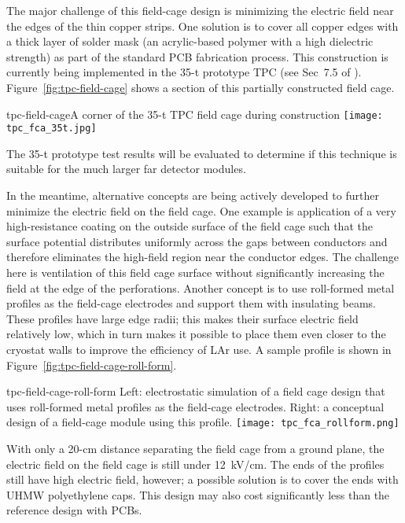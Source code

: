{The major challenge of this field-cage design is minimizing the
electric field near the edges of the thin copper strips.  One solution
is to cover all copper edges with a thick layer of solder mask (an
acrylic-based polymer with a high dielectric strength) as part of the
standard PCB fabrication process.  This construction is currently
being implemented in the 35-t prototype TPC (see Sec~7.5 of
\anxlbnefd).  Figure~\ref{fig:tpc-field-cage} shows a section of this
partially constructed field cage.
\begin{cdrfigure}{tpc-field-cage}{A corner of the 35-t TPC 
field cage during construction}
\texttt{[image: tpc\_fca\_35t.jpg]}
\end{cdrfigure}
The 35-t prototype test results will be evaluated to determine if this
technique is suitable for the much larger far detector modules.
 
In the meantime, alternative concepts are being actively developed to
further minimize the electric field on the field cage.  One example is
application of a very high-resistance coating on the outside surface
of the field cage such that the surface potential distributes
uniformly across the gaps between conductors and therefore eliminates
the high-field region near the conductor edges.  The challenge here is
ventilation of this field cage surface without significantly
increasing the field at the edge of the perforations.  Another concept
is to use roll-formed metal profiles as the field-cage electrodes and
support them with insulating beams.  These profiles have large edge
radii; this makes their surface electric field relatively low, which
in turn makes it possible to place them even closer to the cryostat
walls to improve the efficiency of LAr use.  A sample profile is shown
in Figure~\ref{fig:tpc-field-cage-roll-form}.
\begin{cdrfigure}{tpc-field-cage-roll-form}
{Left: electrostatic simulation of a field cage design that uses roll-formed 
metal profiles as the field-cage electrodes.  Right: a conceptual design of a 
field-cage module using this profile.}
\texttt{[image: tpc\_fca\_rollform.png]}
\end{cdrfigure}
With only a 20-cm distance separating the field cage from a ground
plane, the electric field on the field cage is still under 12~kV/cm.
The ends of the profiles still have high electric field, however; a
possible solution is to cover the ends with UHMW polyethylene caps.
This design may also cost significantly less than the reference design
with PCBs.


}
